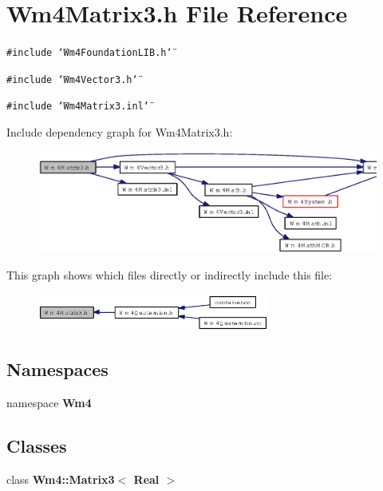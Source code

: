\section{Wm4Matrix3.h File Reference}
\label{Wm4Matrix3_8h}
{\tt \#include \char`\"{}Wm4Foundation\-LIB.h\char`\"{}}\par
{\tt \#include \char`\"{}Wm4Vector3.h\char`\"{}}\par
{\tt \#include \char`\"{}Wm4Matrix3.inl\char`\"{}}\par


Include dependency graph for Wm4Matrix3.h:\begin{figure}[H]
\begin{center}
\leavevmode
\includegraphics[width=351pt]{Wm4Matrix3_8h__incl}
\end{center}
\end{figure}


This graph shows which files directly or indirectly include this file:\begin{figure}[H]
\begin{center}
\leavevmode
\includegraphics[width=216pt]{Wm4Matrix3_8h__dep__incl}
\end{center}
\end{figure}
\subsection*{Namespaces}
\begin{CompactItemize}
\item 
namespace {\bf Wm4}
\end{CompactItemize}
\subsection*{Classes}
\begin{CompactItemize}
\item 
class {\bf Wm4::Matrix3$<$ Real $>$}
\end{CompactItemize}

